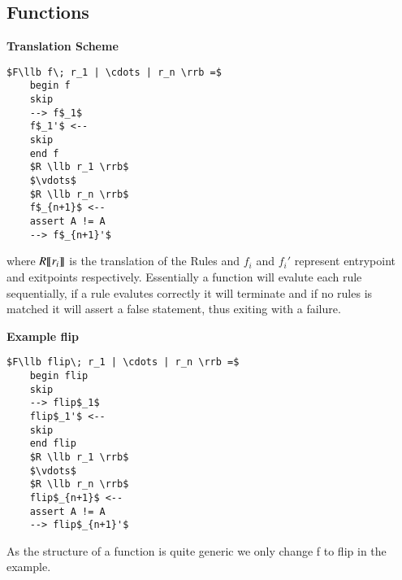 \documentclass[a4paper]{article}
\begin{document}
\subsection{Functions}
\label{sec:org07863a8}
\begin{minipage}[t]{0.6\textwidth}
\textbf{Translation Scheme}
\begin{lstlisting}
$F\llb f\; r_1 | \cdots | r_n \rrb =$
    begin f
    skip
    --> f$_1$
    f$_1'$ <--
    skip
    end f
    $R \llb r_1 \rrb$
    $\vdots$
    $R \llb r_n \rrb$
    f$_{n+1}$ <--
    assert A != A
    --> f$_{n+1}'$
\end{lstlisting}
where \(R \llbracket r_i \rrbracket\) is the translation of the Rules and \(f_i\) and  \(f_i'\) represent entrypoint and exitpoints respectively. Essentially a function will evalute each rule sequentially, if a rule evalutes correctly it will terminate and if no rules is matched it will assert a false statement, thus exiting with a failure.
\end{minipage}
\qquad
\begin{minipage}[t]{0.4\textwidth}
\textbf{Example flip}
\begin{lstlisting}
$F\llb flip\; r_1 | \cdots | r_n \rrb =$
    begin flip
    skip
    --> flip$_1$
    flip$_1'$ <--
    skip
    end flip
    $R \llb r_1 \rrb$
    $\vdots$
    $R \llb r_n \rrb$
    flip$_{n+1}$ <--
    assert A != A
    --> flip$_{n+1}'$
\end{lstlisting}
As the structure of a function is quite generic we only change f to flip in the example.
\end{minipage}
\end{document}
